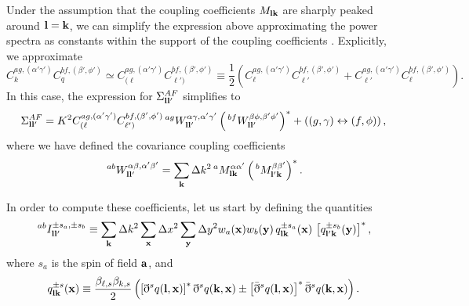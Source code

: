 \documentclass[a4paper,11pt]{article}
\newcommand{\summ}[1]{\sum_{\bf #1}\Delta #1^2}
\begin{document}
      Under the assumption that the coupling coefficients $M_{{\bf l}{\bf k}}$ are sharply peaked around ${\bf l}={\bf k}$, we can simplify the expression above approximating the power spectra as constants within the support of the coupling coefficients \cite{2004MNRAS.349..603E}. Explicitly, we approximate 
      \begin{equation}\nonumber
        C^{ag,(\alpha'\gamma')}_kC^{bf,(\beta',\phi')}_q\simeq C^{ag,(\alpha'\gamma')}_{(\ell}C^{bf,(\beta',\phi')}_{\ell')}\equiv\frac{1}{2}\left(C^{ag,(\alpha'\gamma')}_\ell C^{bf,(\beta',\phi')}_{\ell'}+C^{ag,(\alpha'\gamma')}_{\ell'} C^{bf,(\beta',\phi')}_\ell\right).
      \end{equation}
      In this case, the expression for $\Sigma^{AF}_{{\bf l}{\bf l}'}$ simplifies to
      \begin{align}\label{eq:covar_efstathiou}
        \Sigma^{AF}_{{\bf l}{\bf l}'}=K^2C^{ag,(\alpha'\gamma')}_{(\ell}C^{bf,(\beta',\phi')}_{\ell')}\,^{ag}W^{\alpha\gamma,\alpha'\gamma'}_{{\bf l}{\bf l}'}\left(\,^{bf}W^{\beta\phi,\beta'\phi'}_{{\bf l}{\bf l}'}\right)^*+\left((g,\gamma)\leftrightarrow(f,\phi)\right),
      \end{align}
      where we have defined the covariance coupling coefficients
      \begin{equation}\label{eq:covar_coupling}
        \,^{ab}W^{\alpha\beta,\alpha'\beta'}_{{\bf l}{\bf l}'}=\summ{k}\,^aM^{\alpha\alpha'}_{{\bf l}{\bf k}}\left(\,^bM^{\beta\beta'}_{{\bf l}'{\bf k}}\right)^*.
      \end{equation}

      In order to compute these coefficients, let us start by defining the quantities
      \begin{equation}
        \,^{ab}I^{\pm s_a,\pm s_b}_{{\bf l}{\bf l'}}\equiv\summ{k}\summ{x}\summ{y}w_a({\bf x})w_b({\bf y})\,q^{\pm s_a}_{{\bf l}{\bf k}}({\bf x})\,\left[q^{\pm s_b}_{{\bf l}'{\bf k}}({\bf y})\right]^*,
      \end{equation}
      where $s_a$ is the spin of field ${\bf a}$, and
      \begin{equation}
        q^{\pm s}_{{\bf l}{\bf k}}({\bf x})\equiv \frac{\beta_{\ell,s}\beta_{k,s}}{2}\left(\left[\eth^s q({\bf l},{\bf x})\right]^* \eth^sq({\bf k},{\bf x})\pm\left[\bar{\eth}^sq({\bf l},{\bf x})\right]^*\bar{\eth}^sq({\bf k},{\bf x})\right).
      \end{equation}
\end{document}
